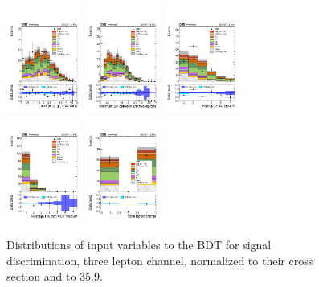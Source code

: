 \begin{figure} [!h]
 \includegraphics[width=0.22\textwidth]{figures/3lsignal/maxEtaJet25_40.pdf}
 \includegraphics[width=0.22\textwidth]{figures/3lsignal/minDRll.pdf}
 \includegraphics[width=0.22\textwidth]{figures/3lsignal/nJet25.pdf} \\
 \includegraphics[width=0.22\textwidth]{figures/3lsignal/nJetEta1_40.pdf}
 \includegraphics[width=0.22\textwidth]{figures/3lsignal/totCharge.pdf}
\caption{Distributions of input variables to the BDT for signal discrimination, three lepton channel, normalized to their cross section and to 35.9\fbinv.} 
\label{fig:input_vars_3l_xsec}
\end{figure}    

